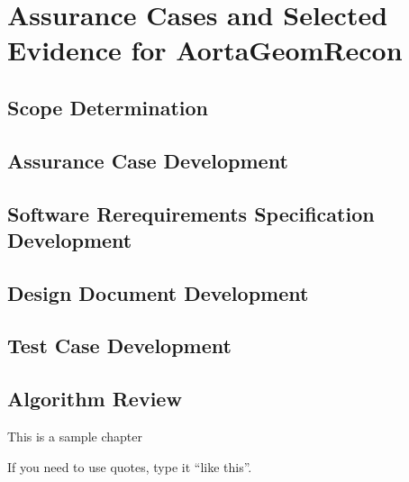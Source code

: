 \chapter{Assurance Cases and Selected Evidence for AortaGeomRecon}

\section{Scope Determination}

\section{Assurance Case Development}

\section{Software Rerequirements Specification Development}

\section{Design Document Development}

\section{Test Case Development}

\section{Algorithm Review}


This is a sample chapter

If you need to use quotes, type it ``like this''.

